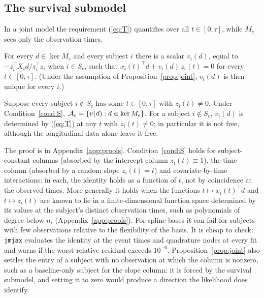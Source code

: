\subsection{The survival submodel}

In a joint model the requirement (\ref{eq:T}) quantifies over all
$t \in [0, \tau]$, while $M_c$ sees only the observation times.

\begin{condition}\label{cond:S}
For every $d \in \ker M_c$ and every subject $i$ there is a scalar
$v_i(d)$, equal to $-z_i^{\top} X_i d / z_i^{\top} z_i$ when $i \in S_c$,
such that $x_i(t)^{\top} d + v_i(d)\, z_i(t) = 0$ for every $t \in [0,
\tau]$. (Under the assumption of Proposition~\ref{prop:joint}, $v_i(d)$ is
then unique for every $i$.)
\end{condition}

\begin{proposition}\label{prop:joint}
Suppose every subject $i \notin S_c$ has some $t \in [0, \tau]$ with
$z_i(t) \neq 0$. Under Condition~\ref{cond:S}, $\mathcal{A}_c = \{v(d) : d \in \ker
M_c\}$. For a subject $i \notin S_c$, $v_i(d)$ is determined by
(\ref{eq:T}) at any $t$ with $z_i(t) \neq 0$; in particular it is not
free, although the longitudinal data alone leave it free.
\end{proposition}

The proof is in Appendix~\ref{app:proofs}. Condition~\ref{cond:S}
holds for subject-constant columns (absorbed by the intercept column
$z_i(t) \equiv 1$), the time column (absorbed by a random slope $z_i(t) =
t$) and covariate-by-time interactions: in each, the identity holds as a
function of $t$, not by coincidence at the observed times. More generally
it holds when the functions $t \mapsto x_i(t)^{\top} d$ and $t \mapsto
z_i(t)$ are known to lie in a finite-dimensional function space
determined by its values at the subject's
distinct observation times, such as polynomials of degree below $n_i$
(Appendix~\ref{app:proofs}). For spline bases it can fail for subjects
with few observations relative to the flexibility of the basis. It is
cheap to check: \texttt{jmjax} evaluates the identity at the event times
and quadrature nodes at every fit and warns if the worst relative residual
exceeds $10^{-6}$. Proposition~\ref{prop:joint} also settles the entry of
a subject with no observation at which the column is nonzero, such as a
baseline-only subject for the slope column: it is forced by the survival
submodel, and setting it to zero would produce a direction the likelihood
does identify.

